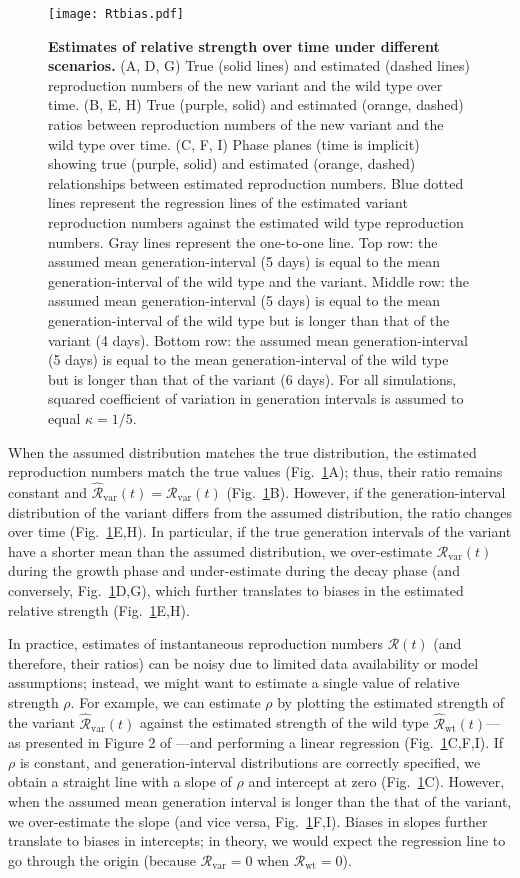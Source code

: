 \documentclass[12pt]{article}
\newcommand{\fref}[1]{Fig.~\ref{fig:#1}}
\newcommand{\vvvar}{\mathrm{var}}
\newcommand{\wwwt}{\mathrm{wt}}
\newcommand{\Rx}[1]{\ensuremath{{\mathcal R}_{#1}}\xspace}
\newcommand{\RR}{\ensuremath{{\mathcal R}}\xspace}
\newcommand{\Rw}{\Rx{\wwwt}}
\newcommand{\Rv}{\Rx{\vvvar}}
\begin{document}
\begin{figure}[!pht]
\texttt{[image: Rtbias.pdf]}
\caption{
\textbf{Estimates of relative strength over time under different scenarios.}
(A, D, G) True (solid lines) and estimated (dashed lines) reproduction numbers of the new variant and the wild type over time.
(B, E, H) True (purple, solid) and estimated (orange, dashed) ratios between reproduction numbers of the new variant and the wild type over time.
(C, F, I) Phase planes (time is implicit) showing true (purple, solid) and estimated (orange, dashed) relationships between estimated reproduction numbers.
Blue dotted lines represent the regression lines of the estimated variant reproduction numbers against the estimated wild type reproduction numbers.
Gray lines represent the one-to-one line.
Top row: the assumed mean generation-interval (5 days) is equal to the mean generation-interval of the wild type and the variant.
Middle row: the assumed mean generation-interval (5 days) is equal to the mean generation-interval of the wild type but is longer than that of the variant (4 days).
Bottom row: the assumed mean generation-interval (5 days) is equal to the mean generation-interval of the wild type but is longer than that of the variant (6 days).
For all simulations, squared coefficient of variation in generation intervals is assumed to equal $\kappa = 1/5$.
}
\label{fig:Rtbias}
\end{figure}

When the assumed distribution matches the true distribution, the estimated reproduction numbers match the true values (\fref{Rtbias}A); thus, their ratio remains constant and $\hat{\RR}_{\textrm{var}}(t)=\Rv(t)$ (\fref{Rtbias}B).
However, if the generation-interval distribution of the variant differs from the assumed distribution, the ratio changes over time (\fref{Rtbias}E,H).
In particular, if the true generation intervals of the variant have a shorter mean than the assumed distribution, we over-estimate $\Rv(t)$ during the growth phase and under-estimate during the decay phase (and conversely, \fref{Rtbias}D,G), which further translates to biases in the estimated relative strength (\fref{Rtbias}E,H).

In practice, estimates of instantaneous reproduction numbers $\RR(t)$ (and therefore, their ratios) can be noisy due to limited data availability or model assumptions;
instead, we might want to estimate a single value of relative strength $\rho$.
For example, we can estimate $\rho$ by plotting the estimated strength of the variant $\hat{\RR}_{\textrm{var}}(t)$ against the estimated strength of the wild type $\hat{\RR}_{\textrm{wt}}(t)$---as presented in Figure 2 of \cite{volz2021transmission}---and performing a linear regression (\fref{Rtbias}C,F,I).
If $\rho$ is constant, and generation-interval distributions are correctly specified, we obtain a straight line with a slope of $\rho$ and intercept at zero (\fref{Rtbias}C).
However, when the assumed mean generation interval is longer than the that of the variant, we over-estimate the slope (and vice versa, \fref{Rtbias}F,I).
Biases in slopes further translate to biases in intercepts; in theory, we would expect the regression line to go through the origin (because $\Rv = 0$ when $\Rw = 0$).
\end{document}
